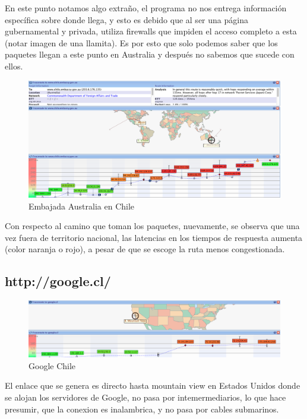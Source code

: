 \documentclass[a4papaer]{article}
\begin{document}
En este punto notamos algo extraño, el programa no nos entrega información específica sobre donde llega, y esto es debido que al ser una página gubernamental y privada, utiliza firewalls que impiden el acceso completo a esta (notar imagen de una llamita). Es por esto que solo podemos saber que los paquetes llegan a este punto en Australia y después no sabemos que sucede con ellos.

\pagebreak

\begin{figure}[h]
  \centering
    \includegraphics[width=1\textwidth]{au2}
  \caption{Embajada Australia en Chile}
  \label{fig:Trace Route de http://www.chile.embassy.gov.au/}
\end{figure}

Con respecto al camino que toman los paquetes, nuevamente, se observa que una vez fuera de territorio nacional, las latencias en los tiempos de respuesta aumenta (color naranja o rojo), a pesar de que se escoge la ruta menos congestionada.

\pagebreak

\subsection{http://google.cl/}

\begin{figure}[h]
  \centering
    \includegraphics[width=1\textwidth]{g1}
  \caption{Google Chile}
  \label{fig:Trace Route de http://www.google.cl/}
\end{figure}

El enlace que se genera es directo hasta mountain view en Estados Unidos donde se alojan los servidores de Google, no pasa por intemermediarios, lo que hace presumir, que la conexion es inalambrica, y no pasa por cables submarinos.
\end{document}
